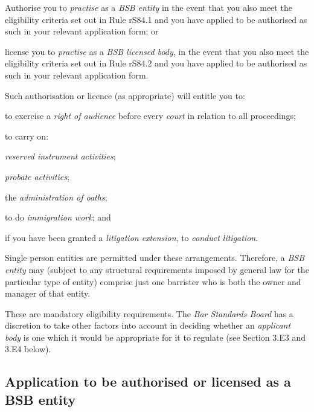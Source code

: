 
Authorise you to \emph{practise} as a \emph{BSB entity} in the event
that you also meet the eligibility criteria set out in Rule rS84.1 and
you have applied to be authorised as such in your relevant application
form; or\nl\item license you to \emph{practise} as a \emph{BSB licensed body}, in the
event that you also meet the eligibility criteria set out in Rule rS84.2
and you have applied to be authorised as such in your relevant
application form.\ln


Such authorisation or licence (as appropriate) will entitle you to:\nl\item to exercise a \emph{right of audience} before every \emph{court} in
relation to all proceedings;
\item to carry on:
\al
\item \emph{reserved instrument activities};

\item \emph{probate activities};

\item the \emph{administration of oaths};\la
\item to do \emph{immigration work}; and
\item if you have been granted a \emph{litigation extension}, to
\emph{conduct litigation}.\ln




Single person entities are permitted under these arrangements.
Therefore, a \emph{BSB entity} may (subject to any structural
requirements imposed by general law for the particular type of entity)
comprise just one barrister who is both the owner and manager of that
entity.


These are mandatory eligibility requirements. The \emph{Bar Standards
Board} has a discretion to take other factors into account in deciding
whether an \emph{applicant body} is one which it would be appropriate
for it to regulate (see Section 3.E3 and 3.E4 below).



\subsection{Application to be authorised or licensed as a BSB entity}


